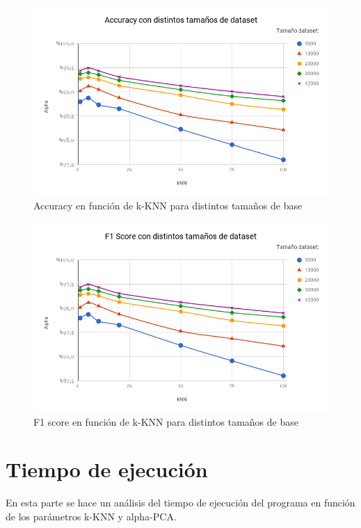 \begin{figure}[h]
	\centering
	\includegraphics[width=\textwidth]{graficos/Accuracy_distintos_tamanos.png}
	\caption{Accuracy en función de k-KNN para distintos tamaños de base}
	\label{fig:distintos_tamanos_accuracy}
\end{figure}

\begin{figure}[H]
	\centering
	\includegraphics[width=\textwidth]{graficos/F1_score_distintos_tamanos.png}
	\caption{F1 score en función de k-KNN para distintos tamaños de base}
	\label{fig:distintos_tamanos_f1score}
\end{figure}


\section{Tiempo de ejecución}

En esta parte se hace un análisis del tiempo de ejecución del programa en función de los parámetros k-KNN y alpha-PCA.

